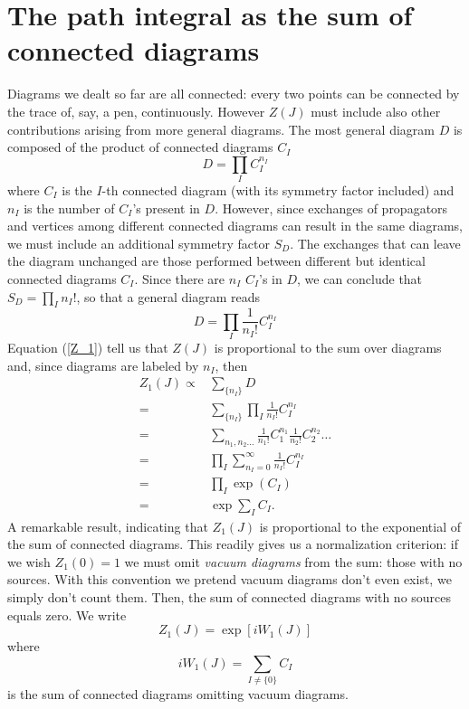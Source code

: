 \section{The path integral as the sum of connected diagrams}
Diagrams we dealt so far are all connected:  every two points can be connected by the trace of, say, a pen, continuously. However $Z(J)$ must include also other contributions arising from more general diagrams. The most general diagram $D$ is composed of the product of connected diagrams $C_I$
\begin{equation}
    D=\prod_{I}C_I^{n_I}
\end{equation}
where $C_I$ is the $I$-th connected diagram (with its symmetry factor included) and $n_I$ is the number of $C_I$'s present in $D$. However, since exchanges of propagators and vertices among different connected diagrams can result in the same diagrams, we must include an additional symmetry factor $S_D$. The exchanges that can leave the diagram unchanged are those performed between different but identical connected diagrams $C_I$. Since there are $n_I$ $C_I$'s in $D$, we can conclude that $S_D=\prod_I n_I!$, so that a general diagram reads
\begin{equation}
    D=\prod_{I}\frac{1}{n_I!}C_I^{n_I}
\end{equation}
Equation (\ref{Z_1}) tell us that $Z(J)$ is proportional to the sum over diagrams and, since diagrams are labeled by $n_I$, then
\begin{equation}
\begin{aligned}
        Z_1(J)\propto&\sum_{\{n_I\}}D\\=&\sum_{\{n_I\}}\prod_{I}\frac{1}{n_I!}C_I^{n_I}\\
        =&\sum_{n_1,n_2\dots}\frac{1}{n_1!}C_1^{n_1}\frac{1}{n_2!}C_2^{n_2}\dots\\
        =&\prod_I\sum_{n_I=0}^\infty\frac{1}{n_I!}C_I^{n_I}\\
        =&\prod_I\exp(C_I)\\
        =&\exp\sum_IC_I.
\end{aligned}
\end{equation}
A remarkable result, indicating that $Z_1(J)$ is proportional to the exponential of the sum of connected diagrams. This readily gives us a normalization criterion: if we wish $Z_1(0)=1$ we must omit \textit{vacuum diagrams} from the sum: those with no sources. With this convention we pretend vacuum diagrams don't even exist, we simply don't count them. Then, the sum of connected diagrams with no sources equals zero. We write
\begin{equation}
    Z_1(J)=\exp [iW_1(J)]
\end{equation}
where
\begin{equation}
    iW_1(J)=\sum_{I\neq\{0\}}C_I
\end{equation}
is the sum of connected diagrams omitting vacuum diagrams.\\
